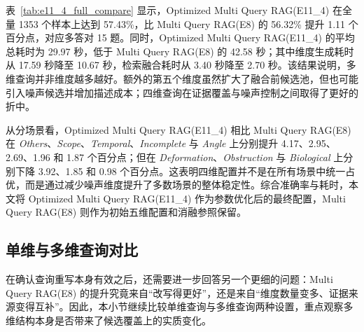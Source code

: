 \begin{table}[H]
\centering
\scriptsize
\caption{Multi Query RAG(E8) 与 Optimized Multi Query RAG(E11\_4) 的全量参数验证结果。}
\label{tab:e11_4_full_compare}
\end{table}

表~\ref{tab:e11_4_full_compare} 显示，Optimized Multi Query RAG(E11\_4) 在全量 1353 个样本上达到 57.43\%，比 Multi Query RAG(E8) 的 56.32\% 提升 1.11 个百分点，对应多答对 15 题。同时，Optimized Multi Query RAG(E11\_4) 的平均总耗时为 29.97 秒，低于 Multi Query RAG(E8) 的 42.58 秒；其中维度生成耗时从 17.59 秒降至 10.67 秒，检索融合耗时从 3.40 秒降至 2.70 秒。该结果说明，多维查询并非维度越多越好。额外的第五个维度虽然扩大了融合前候选池，但也可能引入噪声候选并增加描述成本；四维查询在证据覆盖与噪声控制之间取得了更好的折中。

从分场景看，Optimized Multi Query RAG(E11\_4) 相比 Multi Query RAG(E8) 在 \textit{Others}、\textit{Scope}、\textit{Temporal}、\textit{Incomplete} 与 \textit{Angle} 上分别提升 4.17、2.95、2.69、1.96 和 1.87 个百分点；但在 \textit{Deformation}、\textit{Obstruction} 与 \textit{Biological} 上分别下降 3.92、1.85 和 0.98 个百分点。这表明四维配置并不是在所有场景中统一占优，而是通过减少噪声维度提升了多数场景的整体稳定性。综合准确率与耗时，本文将 Optimized Multi Query RAG(E11\_4) 作为参数优化后的最终配置，Multi Query RAG(E8) 则作为初始五维配置和消融参照保留。

\subsection{单维与多维查询对比}

在确认查询重写本身有效之后，还需要进一步回答另一个更细的问题：Multi Query RAG(E8) 的提升究竟来自“改写得更好”，还是来自“维度数量变多、证据来源变得互补”。因此，本小节继续比较单维查询与多维查询两种设置，重点观察多维结构本身是否带来了候选覆盖上的实质变化。

